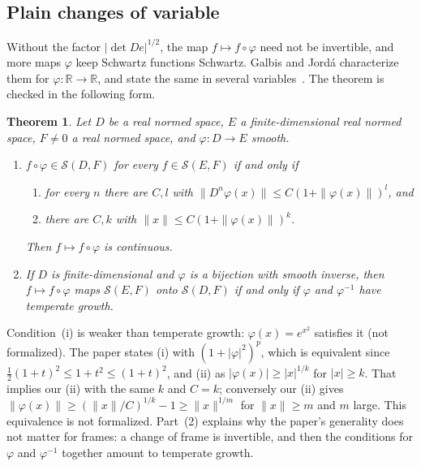 \documentclass[11pt]{article}
\newtheorem{theorem}{Theorem}[section]
\theoremstyle{definition}
\begin{document}
\subsection{Plain changes of variable}
\label{sec:galbis}

Without the factor $|\det De|^{1/2}$, the map $f \mapsto f \circ \varphi$ need not be invertible,
and more maps $\varphi$ keep Schwartz functions Schwartz. Galbis and Jordá characterize them for
$\varphi : \mathbb R \to \mathbb R$, and state the same in several
variables~\cite[Thm.~2.3, Remark~2.4]{galbis}. The theorem is checked in the following form.

\begin{theorem}\label{thm:galbis}
  Let $D$ be a real normed space, $E$ a finite-dimensional real normed space, $F \ne 0$ a real
  normed space, and $\varphi : D \to E$ smooth.
  \begin{enumerate}
    \item $f \circ \varphi \in \mathcal S(D, F)$ for every $f \in \mathcal S(E, F)$ if and only if
      \begin{enumerate}
        \item[(i)] for every $n$ there are $C, l$ with
          $\|D^n\varphi(x)\| \le C(1 + \|\varphi(x)\|)^l$, and
        \item[(ii)] there are $C, k$ with $\|x\| \le C(1 + \|\varphi(x)\|)^k$.
      \end{enumerate}
      Then $f \mapsto f \circ \varphi$ is continuous.
    \item If $D$ is finite-dimensional and $\varphi$ is a bijection with smooth inverse, then
      $f \mapsto f \circ \varphi$ maps $\mathcal S(E, F)$ onto $\mathcal S(D, F)$ if and only if
      $\varphi$ and $\varphi^{-1}$ have temperate growth.
  \end{enumerate}
\end{theorem}

Condition~(i) is weaker than temperate growth: $\varphi(x) = e^{x^2}$ satisfies it (not
formalized). The paper states (i) with $(1 + |\varphi|^2)^p$, which is equivalent since
$\frac12(1 + t)^2 \le 1 + t^2 \le (1 + t)^2$, and (ii) as $|\varphi(x)| \ge |x|^{1/k}$ for
$|x| \ge k$. That implies our (ii) with the same $k$ and $C = k$; conversely our (ii) gives
$\|\varphi(x)\| \ge (\|x\|/C)^{1/k} - 1 \ge \|x\|^{1/m}$ for $\|x\| \ge m$ and $m$ large. This
equivalence is not formalized. Part~(2) explains why the paper's generality does not matter for
frames: a change of frame is invertible, and then the conditions for $\varphi$ and
$\varphi^{-1}$ together amount to temperate growth.
\end{document}
